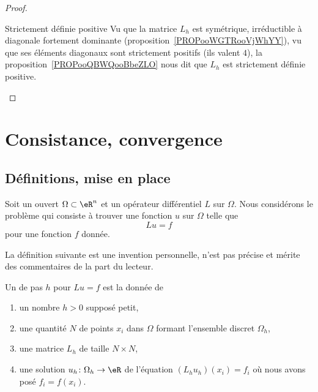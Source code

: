 \begin{proof}
\begin{subproof}
		\item[Strictement définie positive]
		Vu que la matrice \( L_h\) est symétrique, irréductible à diagonale fortement dominante (proposition~\ref{PROPooWGTRooVjWhYY}), vu que ses éléments diagonaux sont strictement positifs (ils valent \( 4\)), la proposition~\ref{PROPooQBWQooBbeZLO} nous dit que \( L_h\) est strictement définie positive.

	\end{subproof}
\end{proof}

\section{Consistance, convergence}

\subsection{Définitions, mise en place}

Soit un ouvert \( \Omega\subset \eR^n\) et un opérateur différentiel \( L\) sur \( \Omega\). Nous considérons le problème qui consiste à trouver une fonction \( u\) sur \( \Omega\) telle que
\begin{equation}
	Lu=f
\end{equation}
pour une fonction \( f\) donnée.

\begin{probleme}
	La définition suivante est une invention personnelle, n'est pas précise et mérite des commentaires de la part du lecteur.
\end{probleme}
\begin{definition}
	Un  de pas \( h\) pour \( Lu=f\) est la donnée de
	\begin{enumerate}
		\item
		      un nombre \( h>0\) supposé petit,
		\item
		      une quantité \( N\) de points \( x_i \) dans \( \Omega\) formant l'ensemble discret \( \Omega_h\),
		\item
		      une matrice \( L_h\) de taille \( N\times N\),
		\item
		      une solution \( u_h\colon \Omega_h\to \eR\) de l'équation \( (L_hu_h)(x_i)=f_i\) où nous avons posé \( f_i=f(x_i)\).
	\end{enumerate}
\end{definition}

